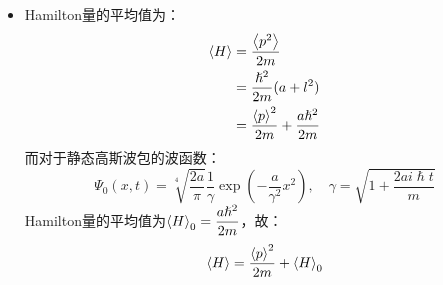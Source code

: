 \documentclass[a4paper,fontset=none]{ctexart}
\renewcommand\hbar\hslash
\begin{document}
\begin{itemize}
        \item[49.(d)]
        Hamilton量的平均值为：
        \begin{align*}
            \expval{H}
            &= \frac{\expval{p^2}}{2m} \\
            &= \frac{\hbar^2}{2m}(a + l^2) \\
            &= \frac{\expval{p}^2}{2m} + \frac{a\hbar^2}{2m}
        \end{align*}
        而对于静态高斯波包的波函数：
        \[
            \Psi_0(x,t) = \sqrt[4]{\frac{2a}{\pi}} \frac{1}{\gamma} \exp(-\frac{a}{\gamma^2}x^2),\quad \gamma = \sqrt{1 + \frac{2ai\hbar t}{m}}
        \]
        Hamilton量的平均值为$\expval{H}_0 = \dfrac{a\hbar^2}{2m}$，故：
        \[
            \expval{H} = \frac{\expval{p}^2}{2m} + \expval{H}_0
        \]
    \end{itemize}
\end{document}
